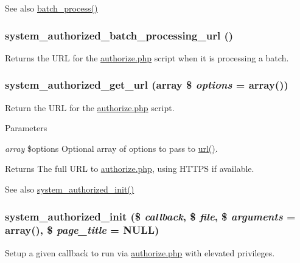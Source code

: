 \begin{DoxySeeAlso}{See also}
\hyperlink{group__batch_gab17f59692632a482cee4f65f27d082f7}{batch\_\-process()} 
\end{DoxySeeAlso}
\hypertarget{group__authorize_gae4eeb93b25a44e4280535f21ed0a0c78}{
\subsubsection[{system\_\-authorized\_\-batch\_\-processing\_\-url}]{\setlength{\rightskip}{0pt plus 5cm}system\_\-authorized\_\-batch\_\-processing\_\-url ()}}
\label{group__authorize_gae4eeb93b25a44e4280535f21ed0a0c78}
Returns the URL for the \hyperlink{authorize_8php}{authorize.php} script when it is processing a batch. \hypertarget{group__authorize_gab59393fbd369097724650dec4be9c1dd}{
\subsubsection[{system\_\-authorized\_\-get\_\-url}]{\setlength{\rightskip}{0pt plus 5cm}system\_\-authorized\_\-get\_\-url (array \$ {\em options} = {\ttfamily array()})}}
\label{group__authorize_gab59393fbd369097724650dec4be9c1dd}
Return the URL for the \hyperlink{authorize_8php}{authorize.php} script.


\begin{DoxyParams}{Parameters}
\item[{\em array}]\$options Optional array of options to pass to \hyperlink{common_8inc_a43b2a0594431556db49df980801d8807}{url()}. \end{DoxyParams}
\begin{DoxyReturn}{Returns}
The full URL to \hyperlink{authorize_8php}{authorize.php}, using HTTPS if available.
\end{DoxyReturn}
\begin{DoxySeeAlso}{See also}
\hyperlink{group__authorize_ga17756b29805705dbea25798d6004d5dd}{system\_\-authorized\_\-init()} 
\end{DoxySeeAlso}
\hypertarget{group__authorize_ga17756b29805705dbea25798d6004d5dd}{
\subsubsection[{system\_\-authorized\_\-init}]{\setlength{\rightskip}{0pt plus 5cm}system\_\-authorized\_\-init (\$ {\em callback}, \/  \$ {\em file}, \/  \$ {\em arguments} = {\ttfamily array()}, \/  \$ {\em page\_\-title} = {\ttfamily NULL})}}
\label{group__authorize_ga17756b29805705dbea25798d6004d5dd}
Setup a given callback to run via \hyperlink{authorize_8php}{authorize.php} with elevated privileges.


